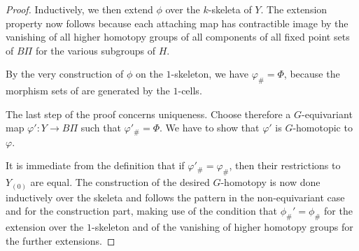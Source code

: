 \documentclass[10pt,a4paper]{amsart}
\begin{document}
\begin{proof}
		Inductively, we then extend $\phi$ over the $k$-skeleta of $Y$. The extension
		property now follows because each attaching map has contractible image by the
		vanishing of all higher homotopy groups of all components of all fixed point
		sets of $B\Pi$ for the various subgroups of $H$.
		
		By the very construction of $\phi$ on the $1$-skeleton, we have
		$\varphi_{\#}=\Phi$, because the morphism sets of
		 are
		generated by the $1$-cells.
		
		The last step of the proof concerns uniqueness. Choose therefore a
		$G$-equivariant map
		$\varphi'\colon Y \to B \Pi$ such that
		$\varphi'_{\#}=\Phi$. We have to show that $\varphi'$ is $G$-homotopic to
		$\varphi$.
		
		It is immediate from the definition that if $\varphi'_{\#}=\varphi_{\#}$, then
		their restrictions to $Y_{(0)}$ are equal. The construction of the desired
		$G$-homotopy is now done inductively over the skeleta and follows the pattern
		in the non-equivariant case and for the construction part, making use of the
		condition that $\phi_\#'=\phi_\#$ for the extension over the $1$-skeleton and
		of the vanishing of higher homotopy groups for the further extensions.
	\end{proof}
\end{document}

